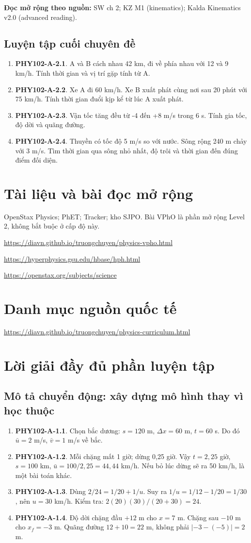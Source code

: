 \documentclass[11pt,a4paper,openany]{book}
\begin{document}
\textbf{Đọc mở rộng theo nguồn:} SW ch 2; KZ M1 (kinematics); Kalda Kinematics v2.0 (advanced reading).

\section{Luyện tập cuối chuyên đề}
\begin{enumerate}
\item \textbf{PHY102-A-2.1}. A và B cách nhau 42 km, đi về phía nhau với 12 và 9 km/h. Tính thời gian và vị trí gặp tính từ A.
\item \textbf{PHY102-A-2.2}. Xe A đi 60 km/h. Xe B xuất phát cùng nơi sau 20 phút với 75 km/h. Tính thời gian đuổi kịp kể từ lúc A xuất phát.
\item \textbf{PHY102-A-2.3}. Vận tốc tăng đều từ -4 đến +8 m/s trong 6 s. Tính gia tốc, độ dời và quãng đường.
\item \textbf{PHY102-A-2.4}. Thuyền có tốc độ 5 m/s so với nước. Sông rộng 240 m chảy với 3 m/s. Tìm thời gian qua sông nhỏ nhất, độ trôi và thời gian đến đúng điểm đối diện.
\end{enumerate}
\chapter*{Tài liệu và bài đọc mở rộng}
OpenStax Physics; PhET; Tracker; kho SJPO. Bài VPhO là phần mở rộng Level 2, không bắt buộc ở cấp độ này.

\url{https://diavn.github.io/truongchuyen/physics-vpho.html}

\url{https://hyperphysics.gsu.edu/hbase/hph.html}

\url{https://openstax.org/subjects/science}
\chapter*{Danh mục nguồn quốc tế}
\url{https://diavn.github.io/truongchuyen/physics-curriculum.html}
\appendix
\chapter{Lời giải đầy đủ phần luyện tập}
\section{Mô tả chuyển động: xây dựng mô hình thay vì học thuộc}
\begin{enumerate}
\item \textbf{PHY102-A-1.1}. Chọn bắc dương: $s=120$ m, $\Delta x=60$ m, $t=60$ s. Do đó $\bar u=2$ m/s, $\bar v=1$ m/s về bắc.
\item \textbf{PHY102-A-1.2}. Mỗi chặng mất 1 giờ; dừng 0,25 giờ. Vậy $t=2{,}25$ giờ, $s=100$ km, $\bar u=100/2{,}25=44{,}44$ km/h. Nếu bỏ lúc dừng sẽ ra 50 km/h, là một bài toán khác.
\item \textbf{PHY102-A-1.3}. Dùng $2/24=1/20+1/u$. Suy ra $1/u=1/12-1/20=1/30$, nên $u=30$ km/h. Kiểm tra: $2(20)(30)/(20+30)=24$.
\item \textbf{PHY102-A-1.4}. Độ dời chặng đầu $+12$ m cho $x=7$ m. Chặng sau $-10$ m cho $x_f=-3$ m. Quãng đường $12+10=22$ m, không phải $|-3-(-5)|=2$ m.
\end{enumerate}
\end{document}
